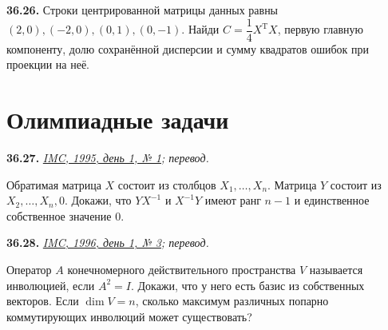 \noindent\begin{minipage}[t]{\linewidth}\textbf{36.26.}\starmark{} Строки центрированной матрицы данных равны \((2,0),(-2,0),(0,1),(0,-1)\). Найди \(C=\dfrac14X^{\mathrm T}X\), первую главную компоненту, долю сохранённой дисперсии и сумму квадратов ошибок при проекции на неё.\par\end{minipage}\par
\par{}\section*{Олимпиадные задачи}
\noindent\begin{minipage}[t]{\linewidth}\textbf{36.27.}\starmark{} {\small\itshape\href{https://www.imc-math.org.uk/imc1995/prob_sol.pdf}{IMC, 1995, день 1, № 1}; перевод.}\par Обратимая матрица \(X\) состоит из столбцов \(X_1,\ldots,X_n\). Матрица \(Y\) состоит из \(X_2,\ldots,X_n,0\). Докажи, что \(YX^{-1}\) и \(X^{-1}Y\) имеют ранг \(n-1\) и единственное собственное значение \(0\).\par\end{minipage}\par
\noindent\begin{minipage}[t]{\linewidth}\textbf{36.28.}\starmark{} {\small\itshape\href{https://www.imc-math.org.uk/imc1996/prob_sol.pdf}{IMC, 1996, день 1, № 3}; перевод.}\par Оператор \(A\) конечномерного действительного пространства \(V\) называется инволюцией, если \(A^2=I\). Докажи, что у него есть базис из собственных векторов. Если \(\dim V=n\), сколько максимум различных попарно коммутирующих инволюций может существовать?\par\end{minipage}\par
\endgroup
